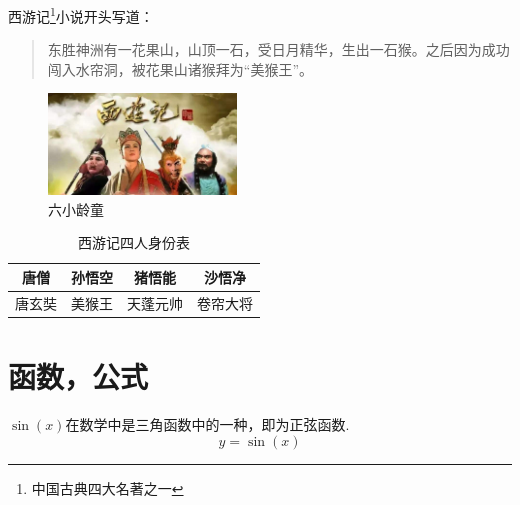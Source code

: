 \documentclass{article} %
\begin{document}
西游记\footnote{中国古典四大名著之一}小说开头写道：
\begin{quote}
{\kaishu 东胜神洲有一花果山，山顶一石，受日月精华，生出一石猴。之后因为成功闯入水帘洞，被花果山诸猴拜为“美猴王”。}
\end{quote}

\begin{figure}[htbp] %
\centering %
\includegraphics[width=5cm]{images/xiyouji.jpeg}%
\caption{六小龄童}
\label{fig:xiyouji}
\end{figure}

\begin{table}[htbp] %
\centering
\caption{西游记四人身份表}
\begin{tabular}{cccc} %
\hline  %
唐僧 & 孙悟空 &猪悟能 &沙悟净\\ %
\hline
唐玄奘 &美猴王 &天蓬元帅&卷帘大将\\
\hline
\end{tabular}
\end{table}


\section{函数，公式}
$\sin(x)$在数学中是三角函数中的一种，即为正弦函数.
\begin{equation}
y=\sin(x)
\end{equation}

\end{document}
